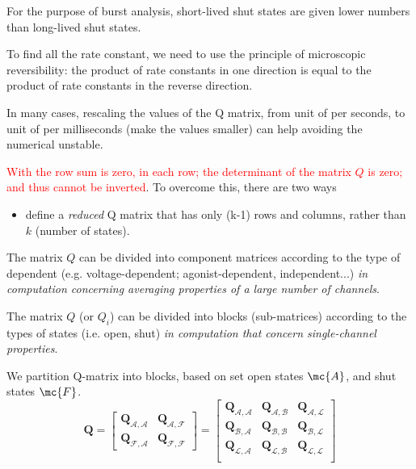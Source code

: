 \begin{framed}
  For the purpose of burst analysis, short-lived shut states are given
  lower numbers than long-lived shut states.
\end{framed}

\begin{framed}
  To find all the rate constant, we need to use the principle of
  microscopic reversibility: the product of rate constants in one
  direction is equal to the product of rate constants in the reverse
  direction.

  In many cases, rescaling the values of the Q matrix, from unit of
  per seconds, to unit of per milliseconds (make the values smaller)
  can help avoiding the numerical unstable.
\end{framed}


\begin{framed}
  \textcolor{red}{With the row sum is zero, in each row; the
    determinant of the matrix $Q$ is zero; and thus cannot be
    inverted}. To overcome this, there are two ways
  \begin{itemize}
  \item define a {\it reduced} Q matrix that has only (k-1) rows and
    columns, rather than $k$ (number of states).
  \end{itemize}

  The matrix $Q$ can be divided into component matrices according to
  the type of dependent (e.g. voltage-dependent; agonist-dependent,
  independent...) {\it in computation concerning averaging properties
    of a large number of channels}.

  The matrix $Q$ (or $Q_i$) can be divided into blocks (sub-matrices)
  according to the types of states (i.e. open, shut) {\it in
    computation that concern single-channel properties}.
\end{framed}

We partition Q-matrix into blocks, based on set open states $\mc{A}$,
and shut states $\mc{F}$.
\begin{equation}
  \label{eq:573}
  \mathbf{Q} = \left[    \begin{array}{cc}
      \mathbf{Q}_{\mathcal{A,A}} &  \mathbf{Q}_{\mathcal{A,F}} \\
      \mathbf{Q}_{\mathcal{F,A}} &  \mathbf{Q}_{\mathcal{F,F}}
    \end{array}
  \right] =
  \left[    \begin{array}{ccc}
      \mathbf{Q}_{\mathcal{A,A}} &  \mathbf{Q}_{\mathcal{A,B}} & \mathbf{Q}_{\mathcal{A,L}} \\
      \mathbf{Q}_{\mathcal{B,A}} &  \mathbf{Q}_{\mathcal{B,B}} &
      \mathbf{Q}_{\mathcal{B,L}}\\
      \mathbf{Q}_{\mathcal{L,A}} &  \mathbf{Q}_{\mathcal{L,B}} &
      \mathbf{Q}_{\mathcal{L,L}} \\
    \end{array}
  \right]
\end{equation}

